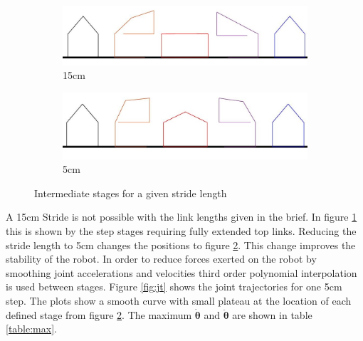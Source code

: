 \documentclass[twoside,twocolumn]{article}
\begin{document}
\begin{figure}[h]
  \centering
  \begin{subfigure}[t]{0.5\textwidth}
    \includegraphics[width=\linewidth]{15cm}
  \caption{15cm}
  \label{fig:steps}
  \end{subfigure}
  \begin{subfigure}[t]{0.5\textwidth}
    \includegraphics[width=\linewidth]{5cm}
  \caption{5cm}
  \label{fig:stages2}
  \end{subfigure}
  \caption{Intermediate stages for a given stride length}
  \label{fig:st}
\end{figure}

A 15cm Stride is not possible with the link lengths given in the brief. In figure \ref{fig:steps} this is shown by the step stages requiring fully extended top links. Reducing the stride length to 5cm changes the positions to figure \ref{fig:stages2}. This change improves the stability of the robot.
\newline
In order to reduce forces exerted on the robot by smoothing joint accelerations and velocities third order polynomial interpolation is used between stages. Figure \ref{fig:jt} shows the joint trajectories for one 5cm step. The plots show a smooth curve with small plateau at the location of each defined stage from figure \ref{fig:stages2}. The maximum $\boldsymbol{\dot{\theta}}$ and $\boldsymbol{\ddot{\theta}}$ are shown in table \ref{table:max}.
\end{document}
